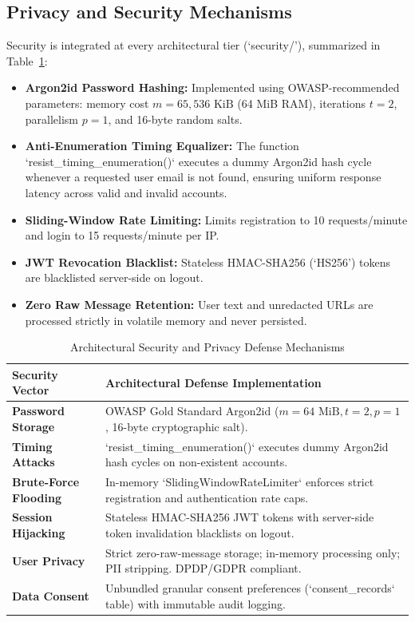 \documentclass[conference]{IEEEtran}
\begin{document}
\subsection{Privacy and Security Mechanisms}
Security is integrated at every architectural tier (`security/'), summarized in Table~\ref{tab:security_mechanisms}:
\begin{itemize}
    \item \textbf{Argon2id Password Hashing:} Implemented using OWASP-recommended parameters: memory cost $m = 65,536\text{ KiB}$ (64 MiB RAM), iterations $t = 2$, parallelism $p = 1$, and 16-byte random salts.
    \item \textbf{Anti-Enumeration Timing Equalizer:} The function `resist_timing_enumeration()` executes a dummy Argon2id hash cycle whenever a requested user email is not found, ensuring uniform response latency across valid and invalid accounts.
    \item \textbf{Sliding-Window Rate Limiting:} Limits registration to 10 requests/minute and login to 15 requests/minute per IP.
    \item \textbf{JWT Revocation Blacklist:} Stateless HMAC-SHA256 (`HS256') tokens are blacklisted server-side on logout.
    \item \textbf{Zero Raw Message Retention:} User text and unredacted URLs are processed strictly in volatile memory and never persisted.
\end{itemize}

\begin{table}[!t]
\centering
\caption{Architectural Security and Privacy Defense Mechanisms}
\label{tab:security_mechanisms}
\begin{tabular}{|l|p{5.5cm}|}
\hline
\textbf{Security Vector} & \textbf{Architectural Defense Implementation} \\
\hline
\textbf{Password Storage} & OWASP Gold Standard Argon2id ($m=64\text{ MiB}, t=2, p=1$, 16-byte cryptographic salt). \\
\hline
\textbf{Timing Attacks} & `resist\_timing\_enumeration()` executes dummy Argon2id hash cycles on non-existent accounts. \\
\hline
\textbf{Brute-Force Flooding} & In-memory `SlidingWindowRateLimiter` enforces strict registration and authentication rate caps. \\
\hline
\textbf{Session Hijacking} & Stateless HMAC-SHA256 JWT tokens with server-side token invalidation blacklists on logout. \\
\hline
\textbf{User Privacy} & Strict zero-raw-message storage; in-memory processing only; PII stripping. DPDP/GDPR compliant. \\
\hline
\textbf{Data Consent} & Unbundled granular consent preferences (`consent\_records` table) with immutable audit logging. \\
\hline
\end{tabular}
\end{table}
\end{document}
